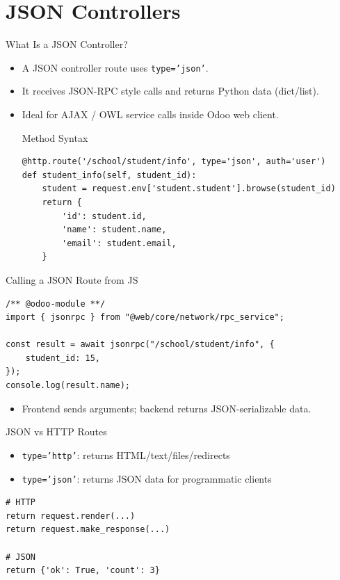 \section{JSON Controllers}

\begin{frame}[fragile]{What Is a JSON Controller?}
	\begin{itemize}
		\item A JSON controller route uses \texttt{type='json'}.
		\item It receives JSON-RPC style calls and returns Python data (dict/list).
		\item Ideal for AJAX / OWL service calls inside Odoo web client.
\begin{block}{Method Syntax}
\begin{lstlisting}
@http.route('/school/student/info', type='json', auth='user')
def student_info(self, student_id):
	student = request.env['student.student'].browse(student_id)
	return {
		'id': student.id,
		'name': student.name,
		'email': student.email,
	}
\end{lstlisting}
\end{block}
	\end{itemize}
\end{frame}

\begin{frame}[fragile]{Calling a JSON Route from JS}
\begin{lstlisting}[style=js]
/** @odoo-module **/
import { jsonrpc } from "@web/core/network/rpc_service";

const result = await jsonrpc("/school/student/info", {
	student_id: 15,
});
console.log(result.name);
\end{lstlisting}
	\begin{itemize}
		\item Frontend sends arguments; backend returns JSON-serializable data.
	\end{itemize}
\end{frame}

\begin{frame}[fragile]{JSON vs HTTP Routes}
	\begin{itemize}
		\item \texttt{type='http'}: returns HTML/text/files/redirects
		\item \texttt{type='json'}: returns JSON data for programmatic clients
	\end{itemize}
\begin{lstlisting}
# HTTP
return request.render(...)
return request.make_response(...)

# JSON
return {'ok': True, 'count': 3}
\end{lstlisting}
\end{frame}

